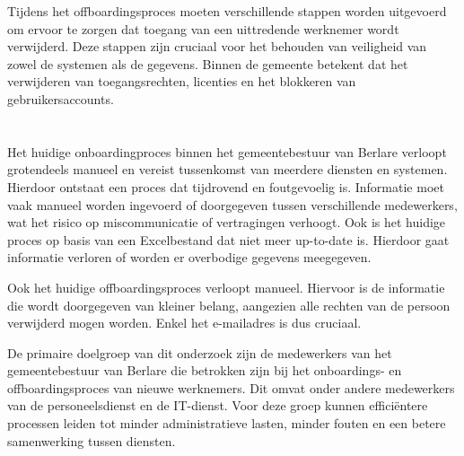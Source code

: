 Tijdens het offboardingsproces moeten verschillende stappen worden uitgevoerd om ervoor te zorgen dat toegang van een uittredende werknemer wordt verwijderd. Deze stappen zijn cruciaal voor het behouden van veiligheid van zowel de systemen als de gegevens. Binnen de gemeente betekent dat het verwijderen van toegangsrechten, licenties en het blokkeren van gebruikersaccounts.


\section{}%
\label{sec:probleemstelling}


Het huidige onboardingproces binnen het gemeentebestuur van Berlare verloopt grotendeels manueel en vereist tussenkomst van meerdere diensten en systemen. Hierdoor ontstaat een proces dat tijdrovend en foutgevoelig is. Informatie moet vaak manueel worden ingevoerd of doorgegeven tussen verschillende medewerkers, wat het risico op miscommunicatie of vertragingen verhoogt. Ook is het huidige proces op basis van een Excelbestand dat niet meer up-to-date is. Hierdoor gaat informatie verloren of worden er overbodige gegevens meegegeven.\newline

Ook het huidige offboardingsproces verloopt manueel. Hiervoor is de informatie die wordt doorgegeven van kleiner belang, aangezien alle rechten van de persoon verwijderd mogen worden. Enkel het e-mailadres is dus cruciaal. \newline

De primaire doelgroep van dit onderzoek zijn de medewerkers van het gemeentebestuur van Berlare die betrokken zijn bij het onboardings- en offboardingsproces van nieuwe werknemers. Dit omvat onder andere medewerkers van de personeelsdienst en de IT-dienst. Voor deze groep kunnen efficiëntere processen leiden tot minder administratieve lasten, minder fouten en een betere samenwerking tussen diensten.\newline


